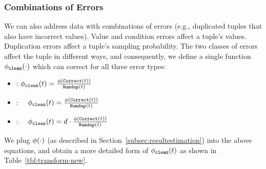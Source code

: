\subsubsection{Combinations of Errors}\label{subsec:comb-challenge}
We can also address data with combinations of errors (e.g., duplicated tuples that also have incorrect values).
Value and condition errors affect a tuple's values.
Duplication errors affect a tuple's sampling probability.
The two classes of errors affect the tuple in different ways, and consequently, we define a single function $\saqpplusfunc(\cdot)$ which can correct for all three error types:


\begin{itemize}\vspace{-.5em}
\item \countfunc: $\saqpplusfunc(t) = \frac{\saqpfunc(\Correct{t})}{\Dedup{t}{P}}$\vspace{-.5em}
\item \sumfunc: ~\, $\saqpplusfunc(t) =\frac{\saqpfunc(\Correct{t})}{\Dedup{t}{P}}$\vspace{-.5em}
\item \avgfunc: ~\, $\saqpplusfunc(t) = d\cdot\frac{\saqpfunc(\Correct{t})}{\Dedup{t}{P}}$ 
\end{itemize}

We plug $\saqpfunc(\cdot)$ (as described in Section~\ref{subsec:resultestimation}) into the above equations, and obtain a more detailed form of $\saqpplusfunc(t)$ as shown in Table~\ref{tbl:transform-new}.

